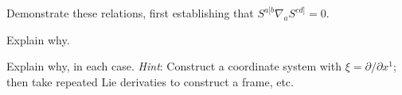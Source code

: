\documentclass[../the-road-to-reality.tex]{subfiles}
\begin{document}
\begin{questions}
\question Demonstrate these relations, first establishing that $S^{a[b}\nabla_aS^{cd]}=0$.

\question Explain why.

\question Explain why, in each case. \textit{Hint}: Construct a coordinate
  system with $\xi = \partial/\partial{x}^1$; then take repeated Lie derivaties
  to construct a frame, etc.
  
\end{questions}
	
\end{document}
